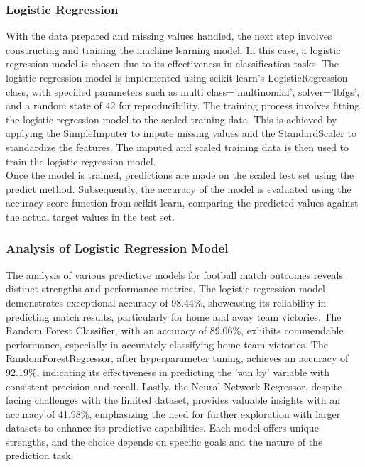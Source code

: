 \documentclass[letterpaper]{article}
\begin{document}
			\subsubsection*{Logistic Regression}
		With the data prepared and missing values handled, the next step involves constructing and training the machine learning model. In this case, a logistic regression model is chosen due to its effectiveness in classification tasks. The logistic regression model is implemented using scikit-learn's LogisticRegression class, with specified parameters such as multi class='multinomial', solver='lbfgs', and a random state of 42 for reproducibility. The training process involves fitting the logistic regression model to the scaled training data. This is achieved by applying the SimpleImputer to impute missing values and the StandardScaler to standardize the features. The imputed and scaled training data is then used to train the logistic regression model.\\
		Once the model is trained, predictions are made on the scaled test set using the predict method. Subsequently, the accuracy of the model is evaluated using the accuracy score function from scikit-learn, comparing the predicted values against the actual target values in the test set.
	
		
			\subsubsection*{Analysis of Logistic Regression Model}
			The analysis of various predictive models for football match outcomes reveals distinct strengths and performance metrics. The logistic regression model demonstrates exceptional accuracy of 98.44\%, showcasing its reliability in predicting match results, particularly for home and away team victories. The Random Forest Classifier, with an accuracy of 89.06\%, exhibits commendable performance, especially in accurately classifying home team victories. The RandomForestRegressor, after hyperparameter tuning, achieves an accuracy of 92.19\%, indicating its effectiveness in predicting the 'win by' variable with consistent precision and recall. Lastly, the Neural Network Regressor, despite facing challenges with the limited dataset, provides valuable insights with an accuracy of 41.98\%, emphasizing the need for further exploration with larger datasets to enhance its predictive capabilities. Each model offers unique strengths, and the choice depends on specific goals and the nature of the prediction task.
		
\end{document}
